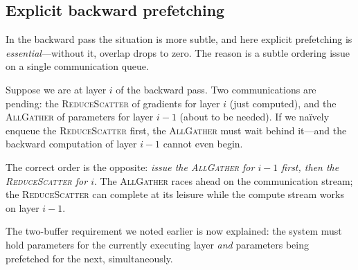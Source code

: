 \documentclass[11pt,a4paper]{article}
\theoremstyle{definition}
\theoremstyle{remark}
\newcommand{\AllGather}{\textsc{AllGather}}
\newcommand{\ReduceScatter}{\textsc{ReduceScatter}}
\begin{document}
\subsection{Explicit backward prefetching}

In the backward pass the situation is more subtle, and here explicit prefetching is \emph{essential}---without it, overlap drops to zero. The reason is a subtle ordering issue on a single communication queue.

Suppose we are at layer $i$ of the backward pass. Two communications are pending: the \ReduceScatter{} of gradients for layer $i$ (just computed), and the \AllGather{} of parameters for layer $i-1$ (about to be needed). If we na\"ively enqueue the \ReduceScatter{} first, the \AllGather{} must wait behind it---and the backward computation of layer $i-1$ cannot even begin.

The correct order is the opposite: \emph{issue the \AllGather{} for $i-1$ first, then the \ReduceScatter{} for $i$}. The \AllGather{} races ahead on the communication stream; the \ReduceScatter{} can complete at its leisure while the compute stream works on layer $i-1$.

\begin{center}
\end{center}

The two-buffer requirement we noted earlier is now explained: the system must hold parameters for the currently executing layer \emph{and} parameters being prefetched for the next, simultaneously.
\end{document}
